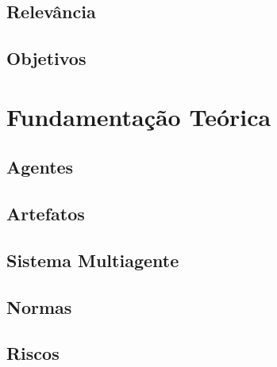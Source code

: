 \documentclass[openright]{normas-utf-tex} %
\begin{document}
	\section{Relevância} \label{relevance}
		

	\section{Objetivos} \label{goals}
		



\chapter{Fundamentação Teórica}
\label{chap:fundteoric}

	

	\section{Agentes} \label{agent}
 
		

	\section{Artefatos} \label{artefact}

		
 
	\section{Sistema Multiagente} \label{sma}

		

	\section{Normas} \label{normasdastani}
		


	\section{Riscos} \label{risksec}

				
\end{document}

